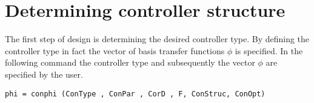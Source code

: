 \documentclass [12pt , a4paper] {report}
\begin{document}
\section{Determining controller structure}
The first step of design is determining the desired controller type. By defining the controller type in fact the vector of basis transfer functions $\phi$ is specified. In the following command the controller type and subsequently the vector $\phi$ are specified by the user.
\begin{lstlisting}
phi = conphi (ConType , ConPar , CorD , F, ConStruc, ConOpt) 
\end{lstlisting}
\end{document}
